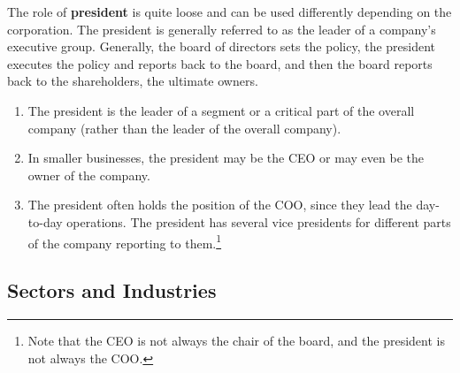 \documentclass{article}
\begin{document}
    \begin{definition}[President]
      \label{def:president}
      The role of \textbf{president} is quite loose and can be used differently depending on the corporation. The president is generally referred to as the leader of a company's executive group. Generally, the board of directors sets the policy, the president executes the policy and reports back to the board, and then the board reports back to the shareholders, the ultimate owners. 
      \begin{enumerate}
          \item The president is the leader of a segment or a critical part of the overall company (rather than the leader of the overall company). 
          \item In smaller businesses, the president may be the CEO or may even be the owner of the company. 
          \item The president often holds the position of the COO, since they lead the day-to-day operations. The president has several vice presidents for different parts of the company reporting to them.\footnote{Note that the CEO is not always the chair of the board, and the president is not always the COO. }
      \end{enumerate}
    \end{definition}

  \subsection{Sectors and Industries}

    \begin{definition}
      \label{def:consumer-staples}
      
    \end{definition}

    \begin{definition}
      \label{def:consumer-discretionary}
      
    \end{definition}

    \begin{definition}
      \label{def:information-technology}
      
    \end{definition}

    \begin{definition}[Finance]
      \label{def:finance}
      
    \end{definition}
\end{document}
